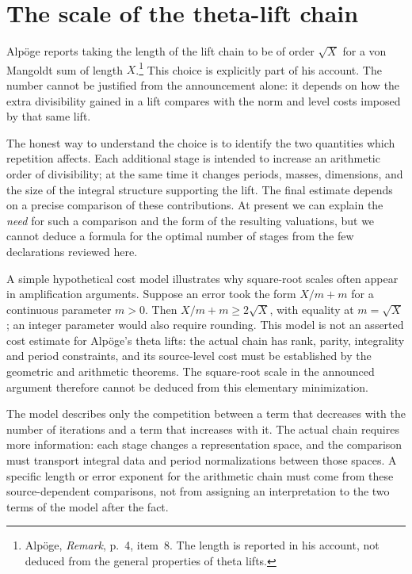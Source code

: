 \documentclass[11pt,openany,oneside]{scrbook}
\theoremstyle{definition}
\theoremstyle{remark}
\begin{document}
\section{The scale of the theta-lift chain}
Alp\"oge reports taking the length of the lift chain to be of order $\sqrt X$ for a von Mangoldt sum of length $X$.\footnote{Alp\"oge, \emph{Remark}, p.~4, item~8. The length is reported in his account, not deduced from the general properties of theta lifts.} This choice is explicitly part of his account. The number cannot be justified from the announcement alone: it depends on how the extra divisibility gained in a lift compares with the norm and level costs imposed by that same lift.

The honest way to understand the choice is to identify the two quantities which repetition affects. Each additional stage is intended to increase an arithmetic order of divisibility; at the same time it changes periods, masses, dimensions, and the size of the integral structure supporting the lift. The final estimate depends on a precise comparison of these contributions. At present we can explain the \emph{need} for such a comparison and the form of the resulting valuations, but we cannot deduce a formula for the optimal number of stages from the few declarations reviewed here.

A simple hypothetical cost model illustrates why square-root scales often appear in amplification arguments. Suppose an error took the form $X/m+m$ for a continuous parameter $m>0$. Then $X/m+m\ge2\sqrt X$, with equality at $m=\sqrt X$; an integer parameter would also require rounding. This model is not an asserted cost estimate for Alp\"oge's theta lifts: the actual chain has rank, parity, integrality and period constraints, and its source-level cost must be established by the geometric and arithmetic theorems. The square-root scale in the announced argument therefore cannot be deduced from this elementary minimization.

The model describes only the competition between a term that decreases with the number of iterations and a term that increases with it. The actual chain requires more information: each stage changes a representation space, and the comparison must transport integral data and period normalizations between those spaces. A specific length or error exponent for the arithmetic chain must come from these source-dependent comparisons, not from assigning an interpretation to the two terms of the model after the fact.
\end{document}
